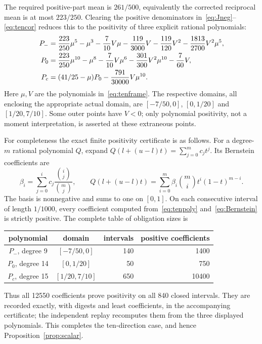 \documentclass[11pt]{article}
\begin{document}
The required positive-part mean is $261/500$, equivalently the
corrected reciprocal mean is at most $223/250$. Clearing the positive
denominators in~\eqref{eq:Jneg}--\eqref{eq:tencor} reduces this to
the positivity of three explicit rational polynomials:
\begin{align}
 P_-={}&\frac{223}{250}\mu^5-\mu^3-\frac7{10}V\mu
 -\frac{119}{3000}V-\frac{119}{120}V^2
 -\frac{1813}{2700}V^2\mu^5,\notag\\
 P_0={}&\frac{223}{250}\mu^{10}-\mu^8-\frac7{10}V\mu^6
 -\frac{301}{300}V^2\mu^{10}-\frac7{60}V,\notag\\
 P_c={}&(41/25-\mu)P_0-\frac{791}{30000}V\mu^{10}.
 \label{eq:tenpoly}
\end{align}
Here $\mu,V$ are the polynomials in~\eqref{eq:tenframe}.
The respective domains, all enclosing the appropriate actual domain,
are $[-7/50,0]$, $[0,1/20]$ and $[1/20,7/10]$.
Some outer points have $V<0$; only polynomial positivity, not a moment
interpretation, is asserted at these extraneous points.

For completeness the exact finite positivity certificate is as follows.
For a degree-$m$ rational polynomial $Q$, expand
$Q(l+(u-l)t)=\sum_{j=0}^m c_jt^j$. Its Bernstein coefficients are
\begin{equation}\label{eq:Bernstein}
 \beta_i=\sum_{j=0}^i c_j\frac{\binom ij}{\binom mj},\qquad
 Q(l+(u-l)t)=\sum_{i=0}^m\beta_i\binom mi t^i(1-t)^{m-i}.
\end{equation}
The basis is nonnegative and sums to one on $[0,1]$.
On each consecutive interval of length $1/1000$, every coefficient
computed from~\eqref{eq:tenpoly} and~\eqref{eq:Bernstein} is strictly
positive. The complete table of obligation sizes is
\begin{center}
\begin{tabular}{ccrr}\toprule
polynomial&domain&intervals&positive coefficients\\\midrule
$P_-$, degree 9&$[-7/50,0]$&140&1400\\
$P_0$, degree 14&$[0,1/20]$&50&750\\
$P_c$, degree 15&$[1/20,7/10]$&650&10400\\\bottomrule
\end{tabular}
\end{center}
Thus all 12550 coefficients prove positivity on all 840 closed
intervals. They are recorded exactly, with digests and least coefficients,
in the accompanying certificate; the independent replay recomputes
them from the three displayed polynomials. This completes the
ten-direction case, and hence Proposition~\ref{prop:scalar}.
\end{document}

